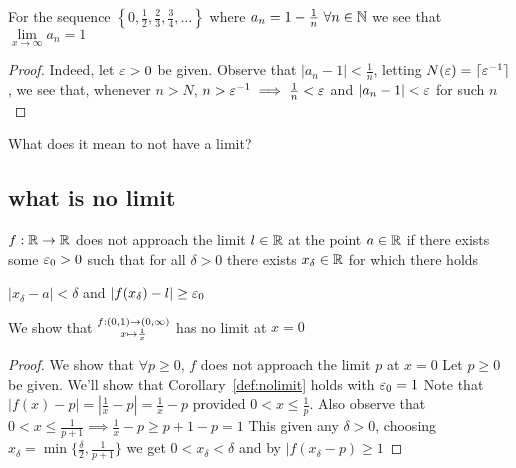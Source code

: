 \begin{example*}
    For the sequence $\left\{0, \frac{1}{2}, \frac{2}{3}, \frac{3}{4}, \dotsc\right\}$ where $a_n = 1-\frac{1}{n}\ \forall n\in\mathbb N$
    we see that $\lim\limits_{x \to \infty} a_n= 1$
\end{example*}
\begin{proof}
    Indeed, let $\varepsilon > 0$ be given. Observe that $|a_n - 1| < \frac{1}{n}$,
     letting $N(\varepsilon) = \lceil \varepsilon^{-1}\rceil$, we see that,
    whenever $n > N$, $n > \varepsilon^{-1} \implies \frac{1}{n} < \varepsilon$ and $|a_n - 1| < \varepsilon$ for such $n$
\end{proof}

What does it mean to not have a limit?

\subsection{what is no limit}
\begin{corollary}\label{def:nolimit}
   $f: \mathbb R \rightarrow \mathbb R$ does not approach the limit $l \in \mathbb R$ at the point $a \in \mathbb R$ if
   there exists some $\varepsilon_0 > 0$ such that for all $\delta > 0$
   there exists $x_\delta \in \mathbb R$ for which there holds
   \begin{center}
       $|x_\delta - a| < \delta$ and $|f(x_\delta) - l| \geq \varepsilon_0$
   \end{center}
\end{corollary}

\begin{example*}
    We show that $\substack{f:(0, 1)\rightarrow (0, \infty)\\
    x\mapsto \frac{1}{x}}$ has no limit at $x=0$
\end{example*}
\begin{proof}
    We show that $\forall p \geq 0$, $f$ does not approach the limit $p$ at $x=0$
    Let $p \geq 0$ be given. We'll show that Corollary~\ref{def:nolimit} holds with $\varepsilon_0 = 1$
    Note that $|f(x)-p| = |\frac{1}{x}-p|=\frac{1}{x} - p$ provided $0 < x \leq \frac{1}{p}$.
    Also observe that $0 < x \leq \frac{1}{p+1} \implies \frac{1}{x} - p \geq p+1-p=1$
    This given any $\delta > 0$, choosing $x_\delta=\min\{\frac{\delta}{2},\frac{1}{p+1}\}$
    we get $0 < x_\delta < \delta$ and by $|f(x_\delta - p) \geq 1$
\end{proof}

